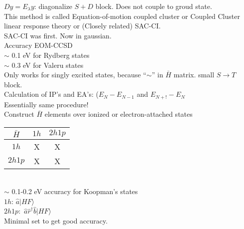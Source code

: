\documentclass[a4paper, 12pt]{article}
\begin{document}
$Dy = E_\lambda y$: diagonalize  $S+D$ block. Does not couple to groud state.\\
\tab This method is called Equation-of-motion coupled cluster or Coupled Cluster linear response theory or (Closely related) SAC-CI. \\
\tab SAC-CI was first. Now in gaussian.\\
\tab Accuracy EOM-CCSD\\
\tab $\sim$ 0.1 eV for Rydberg states \\
\tab $\sim$ 0.3 eV for Valeru states \\
Only works for singly excited states, because ``$\sim$'' in $\bar{H}$ matrix.  small $S\rightarrow T$ block.\\
\tab Calculation of IP's  and EA's: ($E_N-E_{N-1}$ and $E_{N+!}-E_N$\\
\tab Essentially same procedure! \\
\tab Construct $\bar{H}$ elements over ionized or electron-attached states 
\begin{table}[!htbp]
\centering
\begin{tabular}{|c|c|c|}
\hline 
$\bar{H}$ & $1h$ & $2h1p$ \\
\hline  
$1h$ & X & X  \\
\hline 
$2h1p$ & X & X \\
\hline 
\end{tabular}
\end{table}\\
\tab $\sim$ 0.1-0.2 eV accuracy for Koopman's states \\
\tab $1h$: $\hat{a}|HF\rangle$\\
\tab $2h1p:$ $\hat{a}\hat{r}^\dagger\hat{b}|HF\rangle$\\
\tab Minimal set to get good accuracy.
\end{document}
